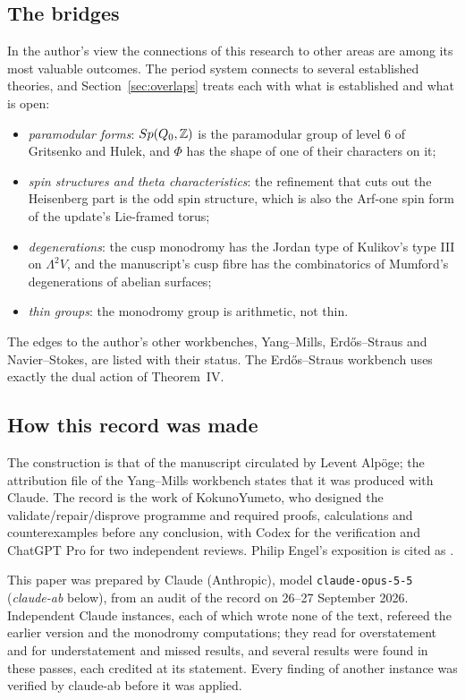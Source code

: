 \subsection*{The bridges}

In the author's view the connections of this research to other areas are among its most valuable outcomes. The period system connects to several established theories, and Section~\ref{sec:overlaps} treats each with what is established and what is open:
\begin{itemize}
\item \emph{paramodular forms}: $Sp(Q_0,\mathbb{Z})$ is the paramodular group of level $6$ of Gritsenko and Hulek, and $\Phi$ has the shape of one of their characters on it;
\item \emph{spin structures and theta characteristics}: the refinement that cuts out the Heisenberg part is the odd spin structure, which is also the Arf-one spin form of the update's Lie-framed torus;
\item \emph{degenerations}: the cusp monodromy has the Jordan type of Kulikov's type III on $\Lambda^2V$, and the manuscript's cusp fibre has the combinatorics of Mumford's degenerations of abelian surfaces;
\item \emph{thin groups}: the monodromy group is arithmetic, not thin.
\end{itemize}
The edges to the author's other workbenches, Yang--Mills, Erdős--Straus and Navier--Stokes, are listed with their status. The Erdős--Straus workbench uses exactly the dual action of Theorem~IV.

\subsection*{How this record was made}

The construction is that of the manuscript circulated by Levent Alpöge; the attribution file of the Yang--Mills workbench states that it was produced with Claude. The record is the work of KokunoYumeto, who designed the validate/repair/disprove programme and required proofs, calculations and counterexamples before any conclusion, with Codex for the verification and ChatGPT Pro for two independent reviews. Philip Engel's exposition is cited as \cite{EngelS6}.

This paper was prepared by Claude (Anthropic), model \texttt{claude-opus-5-5} (\emph{claude-ab} below), from an audit of the record on 26--27 September 2026. Independent Claude instances, each of which wrote none of the text, refereed the earlier version and the monodromy computations; they read for overstatement and for understatement and missed results, and several results were found in these passes, each credited at its statement. Every finding of another instance was verified by claude-ab before it was applied.

